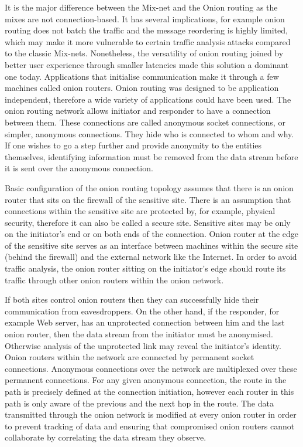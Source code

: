It is the major difference between the Mix-net and the Onion routing as the mixes are not connection-based. It has several implications, for example onion routing does not batch the traffic and the message reordering is highly limited, which may make it more vulnerable to certain traffic analysis attacks compared to the classic Mix-nets. Nonetheless, the versatility of onion routing joined by better user experience through smaller latencies made this solution a dominant one today.
Applications that initialise communication make it through a few machines called onion routers. Onion routing was designed to be application independent, therefore a wide variety of applications could have been used. The onion routing network allows initiator and responder to have a connection between them. These connections are called anonymous socket connections, or simpler, anonymous connections. They hide who is connected to whom and why. If one wishes to go a step further and provide anonymity to the entities themselves, identifying information must be removed from the data stream before it is sent over the anonymous connection.

Basic configuration of the onion routing topology assumes that there is an onion router that sits on the firewall of the sensitive site. There is an assumption that connections within the sensitive site are protected by, for example, physical security, therefore it can also be called a secure site. Sensitive sites may be only on the initiator’s end or on both ends of the connection. Onion router at the edge of the sensitive site serves as an interface between machines within the secure site (behind the firewall) and the external network like the Internet. In order to avoid traffic analysis, the onion router sitting on the initiator’s edge should route its traffic through other onion routers within the onion network.

If both sites control onion routers then they can successfully hide their communication from eavesdroppers. On the other hand, if the responder, for example Web server, has an unprotected connection between him and the last onion router, then the data stream from the initiator must be anonymised. Otherwise analysis of the unprotected link may reveal the initiator’s identity.
Onion routers within the network are connected by permanent socket connections. Anonymous connections over the network are multiplexed over these permanent connections. For any given anonymous connection, the route in the path is precisely defined at the connection initiation, however each router in this path is only aware of the previous and the next hop in the route. The data transmitted through the onion network is modified at every onion router in order to prevent tracking of data and ensuring that compromised onion routers cannot collaborate by correlating the data stream they observe.

